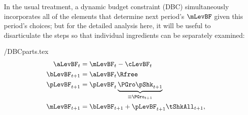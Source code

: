 \documentclass[BufferStockTheory]{subfiles}
\begin{document}
In the usual treatment, a dynamic budget constraint (DBC) simultaneously incorporates
all of the elements that determine next period's $\mLevBF$ given this
period's choices; but for the detailed analysis here, it will be useful to
disarticulate the steps so that individual ingredients can be separately examined:
\begin{verbatimwrite}{\EqDir/DBCparts.tex}
  \begin{align}
    \aLevBF_{t}    & = \mLevBF_{t}-\cLevBF_{t}  \label{eq:DBCparts} \\
    \bLevBF_{t+1}    & = \aLevBF_{t} \Rfree \notag \\
    \pLevBF_{t+1}  & = \pLevBF_{t} \underbrace{\PGro\pShk_{t+1}}_{\equiv \PGro_{t+1}}  \notag \\
    \mLevBF_{t+1}  & =  \bLevBF_{t+1} +\pLevBF_{t+1}\tShkAll_{t+1},  \notag
  \end{align}
\end{verbatimwrite}
\end{document}
